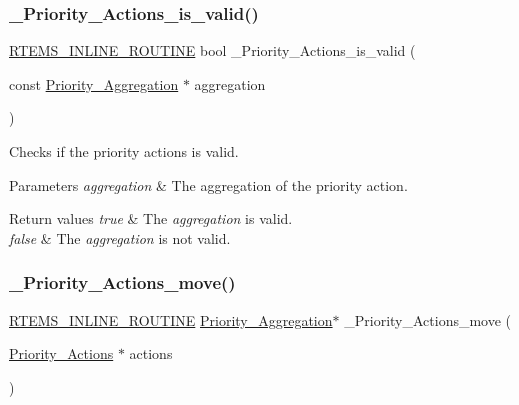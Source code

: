 \subsubsection{\texorpdfstring{\_Priority\_Actions\_is\_valid()}{\_Priority\_Actions\_is\_valid()}}
{\footnotesize\ttfamily \mbox{\hyperlink{group__RTEMSScoreBaseDefs_gac216239df231d5dbd15e3520b0b9313f}{R\+T\+E\+M\+S\+\_\+\+I\+N\+L\+I\+N\+E\+\_\+\+R\+O\+U\+T\+I\+NE}} bool \+\_\+\+Priority\+\_\+\+Actions\+\_\+is\+\_\+valid (\begin{DoxyParamCaption}\item[{const \mbox{\hyperlink{structPriority__Aggregation}{Priority\+\_\+\+Aggregation}} $\ast$}]{aggregation }\end{DoxyParamCaption})}



Checks if the priority actions is valid. 


\begin{DoxyParams}{Parameters}
{\em aggregation} & The aggregation of the priority action.\\
\hline
\end{DoxyParams}

\begin{DoxyRetVals}{Return values}
{\em true} & The {\itshape aggregation} is valid. \\
\hline
{\em false} & The {\itshape aggregation} is not valid. \\
\hline
\end{DoxyRetVals}
\mbox{\label{group__RTEMSScorePriority_ga96d8f44d7473f32a8740950d41f2fa7c}} 
\subsubsection{\texorpdfstring{\_Priority\_Actions\_move()}{\_Priority\_Actions\_move()}}
{\footnotesize\ttfamily \mbox{\hyperlink{group__RTEMSScoreBaseDefs_gac216239df231d5dbd15e3520b0b9313f}{R\+T\+E\+M\+S\+\_\+\+I\+N\+L\+I\+N\+E\+\_\+\+R\+O\+U\+T\+I\+NE}} \mbox{\hyperlink{structPriority__Aggregation}{Priority\+\_\+\+Aggregation}}$\ast$ \+\_\+\+Priority\+\_\+\+Actions\+\_\+move (\begin{DoxyParamCaption}\item[{\mbox{\hyperlink{structPriority__Actions}{Priority\+\_\+\+Actions}} $\ast$}]{actions }\end{DoxyParamCaption})}



